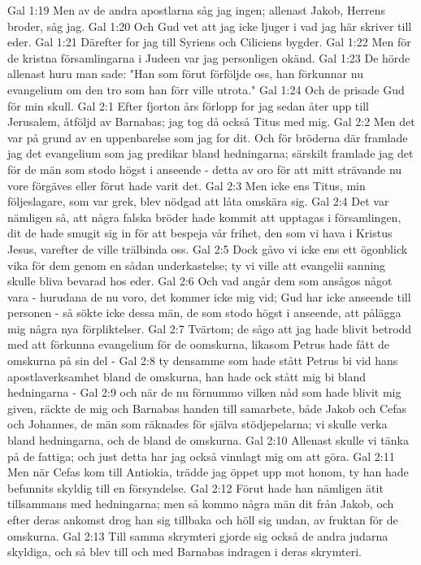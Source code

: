 Gal 1:19  Men av de andra apostlarna såg jag ingen; allenast Jakob, Herrens broder, såg jag.
Gal 1:20  Och Gud vet att jag icke ljuger i vad jag här skriver till eder.
Gal 1:21  Därefter for jag till Syriens och Ciliciens bygder.
Gal 1:22  Men för de kristna församlingarna i Judeen var jag personligen okänd.
Gal 1:23  De hörde allenast huru man sade: "Han som förut förföljde oss, han förkunnar nu evangelium om den tro som han förr ville utrota."
Gal 1:24  Och de prisade Gud för min skull.
Gal 2:1  Efter fjorton års förlopp for jag sedan åter upp till Jerusalem, åtföljd av Barnabas; jag tog då också Titus med mig.
Gal 2:2  Men det var på grund av en uppenbarelse som jag for dit. Och för bröderna där framlade jag det evangelium som jag predikar bland hedningarna; särskilt framlade jag det för de män som stodo högst i anseende - detta av oro för att mitt strävande nu vore förgäves eller förut hade varit det.
Gal 2:3  Men icke ens Titus, min följeslagare, som var grek, blev nödgad att låta omskära sig.
Gal 2:4  Det var nämligen så, att några falska bröder hade kommit att upptagas i församlingen, dit de hade smugit sig in för att bespeja vår frihet, den som vi hava i Kristus Jesus, varefter de ville trälbinda oss.
Gal 2:5  Dock gåvo vi icke ens ett ögonblick vika för dem genom en sådan underkastelse; ty vi ville att evangelii sanning skulle bliva bevarad hos eder.
Gal 2:6  Och vad angår dem som ansågos något vara - hurudana de nu voro, det kommer icke mig vid; Gud har icke anseende till personen - så sökte icke dessa män, de som stodo högst i anseende, att pålägga mig några nya förpliktelser.
Gal 2:7  Tvärtom; de sågo att jag hade blivit betrodd med att förkunna evangelium för de oomskurna, likasom Petrus hade fått de omskurna på sin del -
Gal 2:8  ty densamme som hade stått Petrus bi vid hans apostlaverksamhet bland de omskurna, han hade ock stått mig bi bland hedningarna -
Gal 2:9  och när de nu förnummo vilken nåd som hade blivit mig given, räckte de mig och Barnabas handen till samarbete, både Jakob och Cefas och Johannes, de män som räknades för själva stödjepelarna; vi skulle verka bland hedningarna, och de bland de omskurna.
Gal 2:10  Allenast skulle vi tänka på de fattiga; och just detta har jag också vinnlagt mig om att göra.
Gal 2:11  Men när Cefas kom till Antiokia, trädde jag öppet upp mot honom, ty han hade befunnits skyldig till en försyndelse.
Gal 2:12  Förut hade han nämligen ätit tillsammans med hedningarna; men så kommo några män dit från Jakob, och efter deras ankomst drog han sig tillbaka och höll sig undan, av fruktan för de omskurna.
Gal 2:13  Till samma skrymteri gjorde sig också de andra judarna skyldiga, och så blev till och med Barnabas indragen i deras skrymteri.
